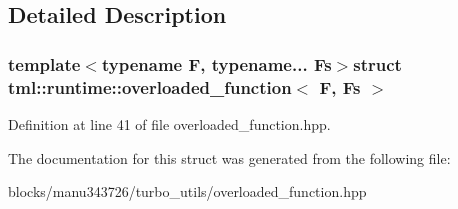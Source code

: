 \subsection{Detailed Description}
\subsubsection*{template$<$typename F, typename... Fs$>$struct tml\+::runtime\+::overloaded\+\_\+function$<$ F, Fs $>$}



Definition at line 41 of file overloaded\+\_\+function.\+hpp.



The documentation for this struct was generated from the following file\+:\begin{DoxyCompactItemize}
\item 
blocks/manu343726/turbo\+\_\+utils/overloaded\+\_\+function.\+hpp\end{DoxyCompactItemize}

